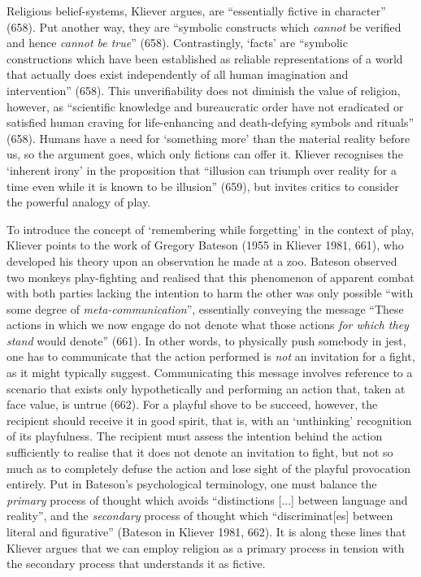 \documentclass[Draft.tex]{subfiles}
\begin{document}
Religious belief-systems, Kliever argues,
are ``essentially fictive in character'' (658).
Put another way, they are
``symbolic constructs which \textit{cannot} be verified
and hence \textit{cannot be true}'' (658).
Contrastingly, `facts' are
``symbolic constructions which have been established as
reliable representations of a world that actually does exist
independently of all human imagination and intervention'' (658).
This unverifiability does not diminish the value of religion,
however, as ``scientific knowledge and bureaucratic order
have not eradicated or satisfied human craving
for life-enhancing and death-defying symbols and rituals'' (658).
Humans have a need for `something more' than
the material reality before us, so the argument goes,
which only fictions can offer it.
Kliever recognises the `inherent irony' in the proposition that
``illusion can triumph over reality for a time
even while it is known to be illusion'' (659),
but invites critics to consider the powerful analogy of play.

To introduce the concept of `remembering while forgetting'
in the context of play, Kliever points to the work of
Gregory Bateson (1955 in Kliever 1981, 661),
who developed his theory upon an observation he made at a zoo.
Bateson observed two monkeys play-fighting and realised that
this phenomenon of apparent combat with both parties lacking
the intention to harm the other was only possible
``with some degree of \textit{meta-communication}'',
essentially conveying the message
``These actions in which we now engage do not denote
what those actions \textit{for which they stand} would denote'' (661).
In other words, to physically push somebody in jest,
one has to communicate that the action performed
is \textit{not} an invitation for a fight, as it might typically suggest.
Communicating this message involves reference to
a scenario that exists only hypothetically and
performing an action that, taken at face value, is untrue (662).
For a playful shove to be succeed, however,
the recipient should receive it in good spirit, that is,
with an `unthinking' recognition of its playfulness.
The recipient must assess the intention behind the action sufficiently
to realise that it does not denote an invitation to fight,
but not so much as to completely defuse the action
and lose sight of the playful provocation entirely.
Put in Bateson's psychological terminology,
one must balance the \textit{primary} process of thought which
avoids ``distinctions [...] between language and reality'',
and the \textit{secondary} process of thought
which ``discriminat[es] between literal and figurative''
(Bateson in Kliever 1981, 662).
It is along these lines that Kliever argues that we can
employ religion as a primary process in tension with
the secondary process that understands it as fictive.
\end{document}
